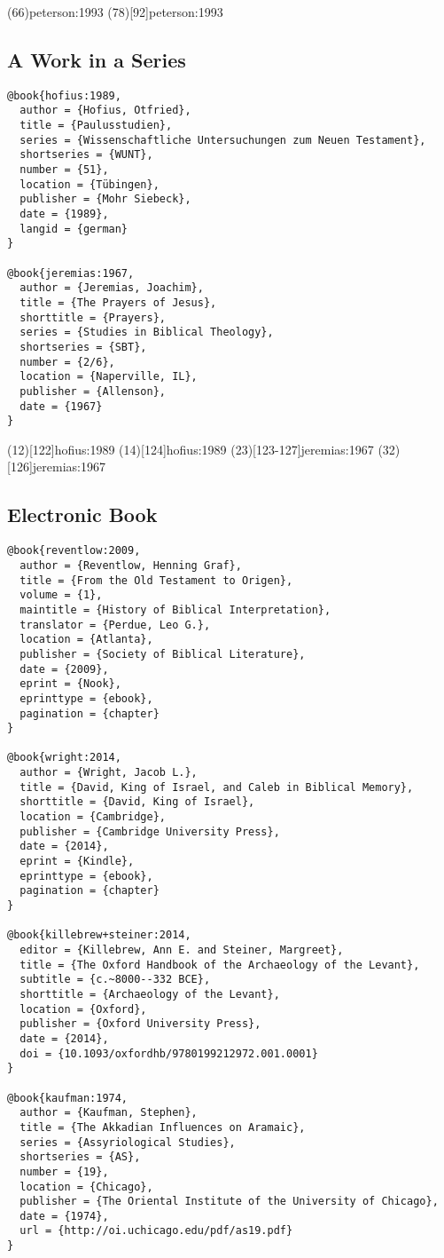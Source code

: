 \documentclass[a4paper]{article}
\begin{document}
\examplecite(66){peterson:1993}
\examplecite(78)[92]{peterson:1993}
\examplebibliography

\subsection{A Work in a Series}

\begin{verbatim}
@book{hofius:1989,
  author = {Hofius, Otfried},
  title = {Paulusstudien},
  series = {Wissenschaftliche Untersuchungen zum Neuen Testament},
  shortseries = {WUNT},
  number = {51},
  location = {Tübingen},
  publisher = {Mohr Siebeck},
  date = {1989},
  langid = {german}
}

@book{jeremias:1967,
  author = {Jeremias, Joachim},
  title = {The Prayers of Jesus},
  shorttitle = {Prayers},
  series = {Studies in Biblical Theology},
  shortseries = {SBT},
  number = {2/6},
  location = {Naperville, IL},
  publisher = {Allenson},
  date = {1967}
}
\end{verbatim}

\examplecite(12)[122]{hofius:1989}
\examplecite(14)[124]{hofius:1989}
\examplecite(23)[123-127]{jeremias:1967}
\examplecite(32)[126]{jeremias:1967}
\exampleabbreviations
\examplebibliography

\subsection{Electronic Book}

\begin{verbatim}
@book{reventlow:2009,
  author = {Reventlow, Henning Graf},
  title = {From the Old Testament to Origen},
  volume = {1},
  maintitle = {History of Biblical Interpretation},
  translator = {Perdue, Leo G.},
  location = {Atlanta},
  publisher = {Society of Biblical Literature},
  date = {2009},
  eprint = {Nook},
  eprinttype = {ebook},
  pagination = {chapter}
}

@book{wright:2014,
  author = {Wright, Jacob L.},
  title = {David, King of Israel, and Caleb in Biblical Memory},
  shorttitle = {David, King of Israel},
  location = {Cambridge},
  publisher = {Cambridge University Press},
  date = {2014},
  eprint = {Kindle},
  eprinttype = {ebook},
  pagination = {chapter}
}

@book{killebrew+steiner:2014,
  editor = {Killebrew, Ann E. and Steiner, Margreet},
  title = {The Oxford Handbook of the Archaeology of the Levant},
  subtitle = {c.~8000--332 BCE},
  shorttitle = {Archaeology of the Levant},
  location = {Oxford},
  publisher = {Oxford University Press},
  date = {2014},
  doi = {10.1093/oxfordhb/9780199212972.001.0001}
}

@book{kaufman:1974,
  author = {Kaufman, Stephen},
  title = {The Akkadian Influences on Aramaic},
  series = {Assyriological Studies},
  shortseries = {AS},
  number = {19},
  location = {Chicago},
  publisher = {The Oriental Institute of the University of Chicago},
  date = {1974},
  url = {http://oi.uchicago.edu/pdf/as19.pdf}
}
\end{verbatim}
\end{document}

